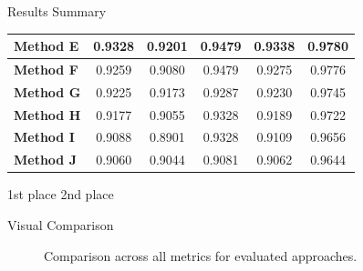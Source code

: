 \documentclass[
    10pt,
    aspectratio=169,
]{beamer}
\begin{document}
\begin{frame}{Results Summary}
\begin{table}[]
\begin{tabular}{|l|c|c|c|c|c|}
\textbf{Method E} & 0.9328                                                         & 0.9201                                  & 0.9479 & 0.9338                                  & 0.9780                                                         \\ \hline
\textbf{Method F}          & 0.9259                                                         & 0.9080                                  & \cellcolor[HTML]{FFD700}0.9479 & 0.9275                                  & 0.9776                                                         \\ \hline
\textbf{Method G}             & 0.9225                                                         & 0.9173                                  & 0.9287                                  & 0.9230                                  & 0.9745                                                         \\ \hline
\textbf{Method H}    & 0.9177                                                         & 0.9055                                  & 0.9328                                  & 0.9189                                  & 0.9722                                                         \\ \hline
\textbf{Method I}            & 0.9088                                                         & 0.8901                                  & 0.9328                                  & 0.9109                                  & 0.9656                                                         \\ \hline
\textbf{Method J}         & 0.9060                                                         & 0.9044                                  & 0.9081                                  & 0.9062                                  & 0.9644                                                         \\ \hline
\end{tabular}
\end{table}

 \scriptsize 1st place
 \scriptsize 2nd place
\end{frame}

\begin{frame}{Visual Comparison}
\begin{figure}
    \centering
    \caption{Comparison across all metrics for evaluated approaches.}
    \label{fig:comparison}
\end{figure}
\end{frame}
\end{document}
